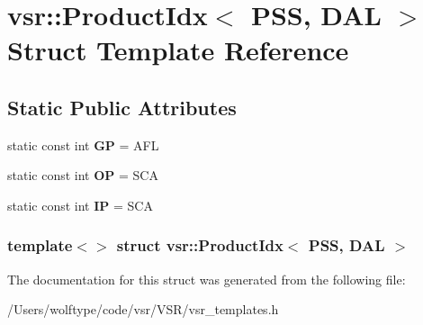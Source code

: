 \hypertarget{structvsr_1_1_product_idx_3_01_p_s_s_00_01_d_a_l_01_4}{\section{vsr\-:\-:Product\-Idx$<$ P\-S\-S, D\-A\-L $>$ Struct Template Reference}
\label{structvsr_1_1_product_idx_3_01_p_s_s_00_01_d_a_l_01_4}
}
\subsection*{Static Public Attributes}
\begin{DoxyCompactItemize}
\item 
\hypertarget{structvsr_1_1_product_idx_3_01_p_s_s_00_01_d_a_l_01_4_a6688353bb2e63dad4143b6e30c263d30}{static const int {\bfseries G\-P} = A\-F\-L}\label{structvsr_1_1_product_idx_3_01_p_s_s_00_01_d_a_l_01_4_a6688353bb2e63dad4143b6e30c263d30}

\item 
\hypertarget{structvsr_1_1_product_idx_3_01_p_s_s_00_01_d_a_l_01_4_a1989a0e9faa1e421d305a3da0d4424e6}{static const int {\bfseries O\-P} = S\-C\-A}\label{structvsr_1_1_product_idx_3_01_p_s_s_00_01_d_a_l_01_4_a1989a0e9faa1e421d305a3da0d4424e6}

\item 
\hypertarget{structvsr_1_1_product_idx_3_01_p_s_s_00_01_d_a_l_01_4_af9cc1d15cf42a3b15ca1b84e6599584a}{static const int {\bfseries I\-P} = S\-C\-A}\label{structvsr_1_1_product_idx_3_01_p_s_s_00_01_d_a_l_01_4_af9cc1d15cf42a3b15ca1b84e6599584a}

\end{DoxyCompactItemize}
\subsubsection*{template$<$$>$ struct vsr\-::\-Product\-Idx$<$ P\-S\-S, D\-A\-L $>$}



The documentation for this struct was generated from the following file\-:\begin{DoxyCompactItemize}
\item 
/\-Users/wolftype/code/vsr/\-V\-S\-R/vsr\-\_\-templates.\-h\end{DoxyCompactItemize}
